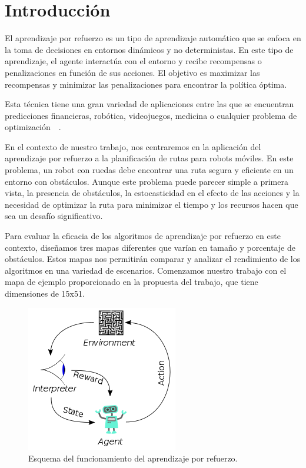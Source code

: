 \documentclass[conference,a4paper]{IEEEtran}
\begin{document}
\section{Introducción}

El aprendizaje por refuerzo es un tipo de aprendizaje automático que se enfoca en la toma de decisiones en entornos dinámicos y no deterministas. 
En este tipo de aprendizaje, el agente interactúa con el entorno y recibe recompensas o penalizaciones en función de sus acciones.
El objetivo es maximizar las recompensas y minimizar las penalizaciones para encontrar la política óptima.

Esta técnica tiene una gran variedad de aplicaciones entre las que se encuentran predicciones financieras, robótica, 
videojuegos, medicina o cualquier problema de optimización~\cite{b2}~\cite{b3}.

En el contexto de nuestro trabajo, nos centraremos en la aplicación del aprendizaje por refuerzo a la planificación de rutas para robots móviles. En este problema, un robot con ruedas debe encontrar una ruta segura y eficiente en un entorno con obstáculos. Aunque este problema puede parecer simple a primera vista, la presencia de obstáculos, la estocasticidad en el efecto de las acciones 
y la necesidad de optimizar la ruta para minimizar el tiempo y los recursos hacen que sea un desafío significativo.

Para evaluar la eficacia de los algoritmos de aprendizaje por refuerzo en este contexto, diseñamos tres mapas diferentes que varían en tamaño y porcentaje de obstáculos. Estos mapas nos permitirán comparar y analizar el rendimiento de los algoritmos en una variedad de escenarios.
Comenzamos nuestro trabajo con el mapa de ejemplo proporcionado en la propuesta del trabajo, que tiene dimensiones de 15x51. 

\begin{figure}[h]
  \centering
  \includegraphics{Reinforcement_learning_diagram.png}
  \caption{Esquema del funcionamiento del aprendizaje por refuerzo.}
  \label{fig:Reinforcement_learning_diagram}
\end{figure}
\end{document}
